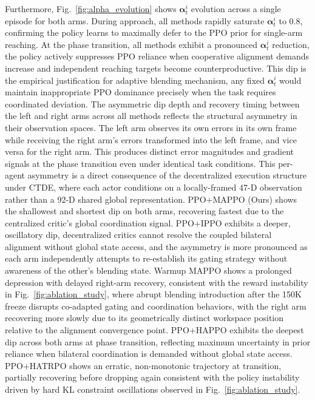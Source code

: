 \documentclass[lettersize,journal]{IEEEtran}
\begin{document}
Furthermore, Fig.~\ref{fig:alpha_evolution} shows $\mathbf{\alpha}^{i}_{t}$ evolution across a single episode for both arms. During approach, all methods rapidly saturate $\mathbf{\alpha}^{i}_{t}$ to 0.8, confirming the policy learns to maximally defer to the PPO prior for single-arm reaching. At the phase transition, all methods exhibit a pronounced $\mathbf{\alpha}^{i}_{t}$ reduction, the policy actively suppresses PPO reliance when cooperative alignment demands increase and independent reaching targets become counterproductive. This dip is the empirical justification for adaptive blending mechanism, any fixed $\mathbf{\alpha}^{i}_{t}$ would maintain inappropriate PPO dominance precisely when the task requires coordinated deviation. The asymmetric dip depth and recovery timing between the left and right arms across all methods reflects the structural asymmetry in their observation spaces. The left arm observes its own errors in its own frame while receiving the right arm's errors transformed into the left frame, and vice versa for the right arm. This produces distinct error magnitudes and gradient signals at the phase transition even under identical task conditions. This per-agent asymmetry is a direct consequence of the decentralized execution structure under CTDE, where each actor conditions on a locally-framed 47-D observation rather than a 92-D shared global representation. PPO+MAPPO (Ours) shows the shallowest and shortest dip on both arms, recovering fastest due to the centralized critic's global coordination signal. PPO+IPPO exhibits a deeper, oscillatory dip, decentralized critics cannot resolve the coupled bilateral alignment without global state access, and the asymmetry is more pronounced as each arm independently attempts to re-establish its gating strategy without awareness of the other's blending state. Warmup MAPPO shows a prolonged depression with delayed right-arm recovery, consistent with the reward instability in Fig.~\ref{fig:ablation_study}, where abrupt blending introduction after the 150K freeze disrupts co-adapted gating and coordination behaviors, with the right arm recovering more slowly due to its geometrically distinct workspace position relative to the alignment convergence point. PPO+HAPPO exhibits the deepest dip across both arms at phase transition, reflecting maximum uncertainty in prior reliance when bilateral coordination is demanded without global state access. PPO+HATRPO shows an erratic, non-monotonic trajectory at transition, partially recovering before dropping again consistent with the policy instability driven by hard KL constraint oscillations observed in Fig.~\ref{fig:ablation_study}.
\end{document}
